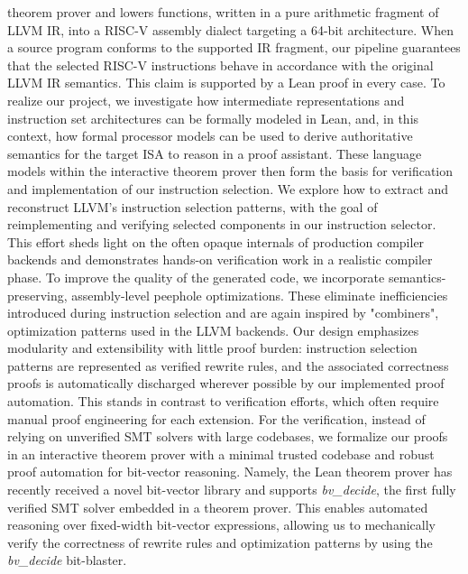 \documentclass[review, anonymous, acmsmall, screen]{acmart}
\begin{document}
theorem prover and lowers functions, written in a pure arithmetic fragment of LLVM IR, into a RISC-V
assembly dialect targeting a 64-bit architecture.  When a source program conforms to the supported
IR fragment, our pipeline guarantees that the selected RISC-V instructions behave in accordance 
with the original LLVM IR semantics. This claim is supported by a Lean proof in every case. To realize our project, we investigate how intermediate representations and instruction set 
architectures can be formally modeled in Lean, and, in this context, how formal processor models 
can be used to derive authoritative semantics for the target ISA to reason in a proof assistant. 
These language models within the interactive theorem prover then form the basis for verification and 
implementation of our instruction selection. We explore how to extract and reconstruct LLVM’s 
instruction selection patterns, with the goal of reimplementing and verifying selected components 
in our instruction selector. This effort sheds light on the often opaque internals of production 
compiler backends and demonstrates hands-on verification work in a realistic compiler phase. To 
improve the quality of the generated code, we incorporate semantics-preserving, assembly-level 
peephole optimizations. These eliminate inefficiencies introduced during instruction selection and
are again inspired by "combiners", optimization patterns used in the LLVM backends.\newline
Our design emphasizes modularity and extensibility with little proof burden: instruction selection 
patterns are represented as verified rewrite rules, and the associated correctness proofs is 
automatically discharged wherever possible by our implemented proof automation. This stands in 
contrast to verification efforts, which often require  manual proof engineering for each extension. 
For the verification, instead of relying on unverified SMT solvers with large codebases, we formalize
our proofs in an interactive theorem prover with a minimal trusted codebase and robust proof automation
for bit-vector reasoning.\newline
Namely, the Lean theorem prover has recently received a novel bit-vector library and 
supports \textit{bv\_decide}, the first fully verified SMT solver embedded in a 
theorem prover. This enables automated reasoning over fixed-width bit-vector expressions, 
allowing us to mechanically verify the correctness of rewrite rules and optimization patterns by 
using the \textit{bv\_decide} bit-blaster.
\end{document}
